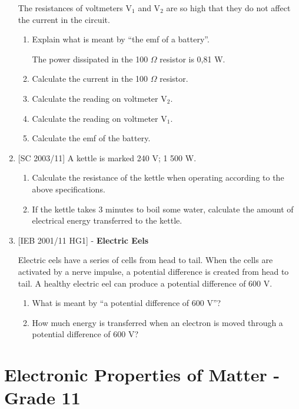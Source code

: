 \begin{enumerate}
{The resistances of voltmeters V$_1$ and V$_2$ are so high that they do not affect the current in the circuit.

\begin{enumerate}
\item{Explain what is meant by ``the emf of a battery''.}

The power dissipated in the 100 $\Omega$ resistor is 0,81 W.
\item{Calculate the current in the 100 $\Omega$ resistor.}
\item{Calculate the reading on voltmeter V$_2$.}
\item{Calculate the reading on voltmeter V$_1$.}
\item{Calculate the emf of the battery.}
\end{enumerate}}

\item{[SC 2003/11] A kettle is marked 240 V; 1 500 W.
\begin{enumerate}
\item{Calculate the resistance of the kettle when operating according to the above specifications.}
\item{If the kettle takes 3 minutes to boil some water, calculate the amount of electrical energy transferred to the kettle.}
\end{enumerate}}

\item{[IEB 2001/11 HG1] - \textbf{Electric Eels}

Electric eels have a series of cells from head to tail. When the cells are activated by a nerve impulse, a potential difference is created from head to tail. A healthy electric eel can produce a potential difference of 600 V.
\begin{enumerate}
\item{What is meant by ``a potential difference of 600 V''?}
\item{How much energy is transferred when an electron is moved through a potential difference of 600 V?}
\end{enumerate}}

\end{enumerate}






\chapter{Electronic Properties of Matter - Grade 11}
\label{p:mm:ep11}

